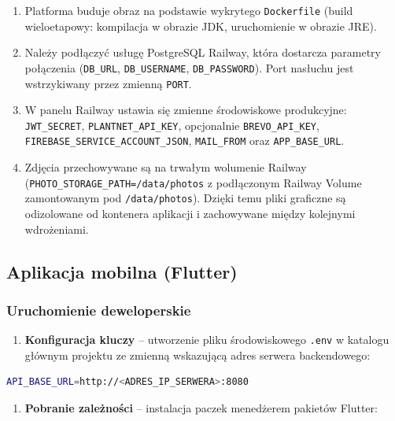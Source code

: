 \documentclass[12pt,a4paper]{article}
\begin{document}
\begin{enumerate}[leftmargin=1.6cm]
    \item Platforma buduje obraz na podstawie wykrytego \texttt{Dockerfile} (build wieloetapowy: kompilacja w obrazie JDK, uruchomienie w obrazie JRE).
    \item Nale\.zy pod\l{}\k{a}czy\'c us\l{}ug\k{e} PostgreSQL Railway, kt\'ora dostarcza parametry po\l{}\k{a}czenia (\texttt{DB\_URL}, \texttt{DB\_USERNAME}, \texttt{DB\_PASSWORD}). Port nas\l{}uchu jest wstrzykiwany przez zmienn\k{a} \texttt{PORT}.
    \item W panelu Railway ustawia si\k{e} zmienne \'srodowiskowe produkcyjne: \texttt{JWT\_SECRET}, \texttt{PLANTNET\_API\_KEY}, opcjonalnie \texttt{BREVO\_API\_KEY}, \texttt{FIREBASE\_\allowbreak{}SERVICE\_\allowbreak{}ACCOUNT\_\allowbreak{}JSON}, \texttt{MAIL\_FROM} oraz \texttt{APP\_BASE\_URL}.
    \item Zdj\k{e}cia przechowywane s\k{a} na trwa\l{}ym wolumenie Railway (\texttt{PHOTO\_\allowbreak{}STORAGE\_\allowbreak{}PATH=\allowbreak{}/data/\allowbreak{}photos} z pod\l{}\k{a}czonym Railway Volume zamontowanym pod \texttt{/data/\allowbreak{}photos}). Dzi\k{e}ki temu pliki graficzne s\k{a} odizolowane od kontenera aplikacji i zachowywane mi\k{e}dzy kolejnymi wdro\.zeniami.
\end{enumerate}

\subsection{Aplikacja mobilna (Flutter)}

\subsubsection{Uruchomienie deweloperskie}

\begin{enumerate}[leftmargin=1.6cm]
    \item \textbf{Konfiguracja kluczy} -- utworzenie pliku \'srodowiskowego \texttt{.env} w katalogu g\l{}\'ownym projektu ze zmienn\k{a} wskazuj\k{a}c\k{a} adres serwera backendowego:
\end{enumerate}

\begin{lstlisting}[language=bash, caption=Zawartosc pliku .env, numbers=none]
API_BASE_URL=http://<ADRES_IP_SERWERA>:8080
\end{lstlisting}

\begin{enumerate}[leftmargin=1.6cm, start=2]
    \item \textbf{Pobranie zale\.zno\'sci} -- instalacja paczek mened\.zerem pakiet\'ow Flutter:
\end{enumerate}
\end{document}
